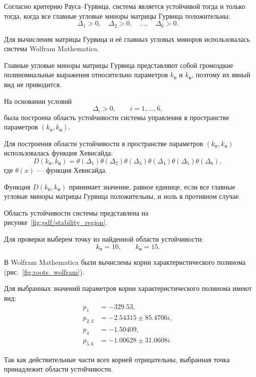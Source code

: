 Согласно критерию Рауса--Гурвица, система является устойчивой тогда и только тогда, когда все главные угловые миноры матрицы Гурвица положительны:
\begin{equation}
    \Delta_1 > 0,
    \quad
    \Delta_2 > 0,
    \quad
    \dots,
    \quad
    \Delta_6 > 0.
\end{equation}

Для вычисления матрицы Гурвица и её главных угловых миноров использовалась система Wolfram Mathematica.

Главные угловые миноры матрицы Гурвица представляют собой
громоздкие полиномиальные выражения относительно параметров
$k_{\text{п}}$ и $k_{\text{и}}$, поэтому их явный вид не приводится.

На основании условий
\[
\Delta_i > 0,
\qquad i = 1,\dots,6,
\]
была построена область устойчивости системы управления в
пространстве параметров $(k_{\text{п}}, k_{\text{и}})$.

Для построения области устойчивости в пространстве параметров $(k_{\text{п}}, k_{\text{и}})$ использовалась функция Хевисайда:
\begin{equation}
    D(k_{\text{п}}, k_{\text{и}})
    =
    \theta(\Delta_1)
    \theta(\Delta_2)
    \theta(\Delta_3)
    \theta(\Delta_4)
    \theta(\Delta_5)
    \theta(\Delta_6),
\end{equation}
где $\theta(x)$ --- функция Хевисайда.

Функция $D(k_{\text{п}},k_{\text{и}})$ принимает значение, равное единице, если все главные угловые миноры матрицы Гурвица положительны, и ноль в противном случае.

Область устойчивости системы представлена на рисунке~\ref{fig:pdf/stability_region}.


Для проверки выберем точку из найденной области устойчивости:
\begin{equation}
    k_{\text{п}} = 10,
    \qquad
    k_{\text{и}} = 15.
\end{equation}

В Wolfram Mathematica были вычислены корни характеристического полинома (рис.~\ref{fig:roots_wolfram}).


Для выбранных значений параметров корни характеристического полинома имеют вид:
\begin{equation}
\begin{aligned}
    p_1 &= -329.53, \\
    p_{2,3} &= -2.54315 \pm 85.4706i, \\
    p_4 &= -1.50409, \\
    p_{5,6} &= -1.00628 \pm 31.0608i.
\end{aligned}
\end{equation}

Так как действительные части всех корней отрицательны, выбранная точка принадлежит области устойчивости.

